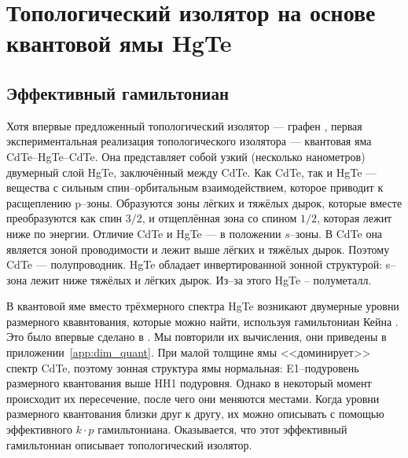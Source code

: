 \section{Топологический изолятор на основе \\квантовой ямы HgTe}
\subsection{Эффективный гамильтониан}
Хотя впервые предложенный топологический изолятор --- графен \cite{Kane2005}, 
первая экспериментальная реализация топологического изолятора ---
квантовая яма CdTe--HgTe--CdTe. Она представляет собой узкий (несколько нанометров)
двумерный слой HgTe, заключённый между CdTe. Как CdTe, так и HgTe --- вещества 
с сильным спин--орбитальным взаимодействием, которое приводит к расщеплению p--зоны.
Образуются зоны лёгких и тяжёлых дырок, которые вместе преобразуются как спин $3/2$,  
и отщеплённая зона со спином $1/2$, которая лежит ниже по энергии. Отличие CdTe и HgTe ---
в положении $s$--зоны. В CdTe она является зоной проводимости и лежит выше лёгких и тяжёлых
дырок. Поэтому CdTe --- полупроводник. HgTe обладает инвертированной зонной структурой:
s--зона лежит ниже тяжёлых и лёгких дырок. Из--за этого HgTe -- полуметалл. 

В квантовой яме вместо трёхмерного спектра HgTe возникают двумерные 
уровни размерного квавнтования, которые можно найти, используя гамильтониан Кейна 
\cite{Kane1957}. Это 
было впервые сделано в \cite{Bernevig2006}. Мы повторили их вычисления, они приведены в 
приложении~\ref{app:dim_quant}.
При малой толщине ямы <<доминирует>> спектр CdTe, поэтому 
зонная структура ямы нормальная: E1--подуровень размерного квантования выше HH1 подуровня. 
Однако в некоторый момент происходит их пересечение, после чего они меняются местами. Когда 
уровни размерного квантования близки друг к другу, их можно описывать с помощью эффективного
$k\cdot p$ гамильтониана. Оказывается, что этот эффективный гамильтониан описывает
топологический изолятор.

